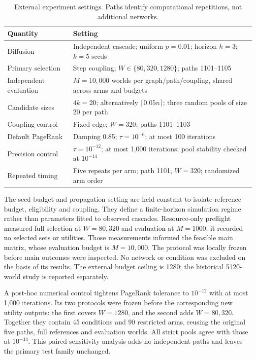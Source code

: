 \documentclass[smallextended]{svjour3}
\begin{document}
\begin{table}[htbp]
\caption{External experiment settings. Paths identify computational repetitions, not additional networks.}\label{tab:settings}
\begin{tabularx}{\linewidth}{lX}
\toprule
Quantity & Setting \\
\midrule
Diffusion & Independent cascade; uniform $p=0.01$; horizon $h=3$; $k=5$ seeds \\
Primary selection & Step coupling; $W\in\{80,320,1280\}$; paths 1101--1105 \\
Independent evaluation & $M=10,000$ worlds per graph/path/coupling, shared across arms and budgets \\
Candidate sizes & $4k=20$; alternatively $\lceil0.05n\rceil$; three random pools of size 20 per path \\
Coupling control & Fixed edge; $W=320$; paths 1101--1103 \\
Default PageRank & Damping 0.85; $\tau=10^{-6}$; at most 100 iterations \\
Precision control & $\tau=10^{-12}$; at most 1,000 iterations; pool stability checked at $10^{-14}$ \\
Repeated timing & Five repeats per arm; path 1101, $W=320$; randomized arm order \\
\bottomrule
\end{tabularx}
\end{table}

The seed budget and propagation setting are held constant to isolate reference budget, eligibility and coupling. They define a finite-horizon simulation regime rather than parameters fitted to observed cascades. Resource-only preflight measured full selection at $W=80,320$ and evaluation at $M=1000$; it recorded no selected sets or utilities. Those measurements informed the feasible main matrix, whose evaluation budget is $M=10,000$. The protocol was locally frozen before main outcomes were inspected. No network or condition was excluded on the basis of its results. The external budget ceiling is 1280; the historical 5120-world study is reported separately.

A post-hoc numerical control tightens PageRank tolerance to $10^{-12}$ with at most 1,000 iterations. Its two protocols were frozen before the corresponding new utility outputs: the first covers $W=1280$, and the second adds $W=80,320$. Together they contain 45 conditions and 90 restricted arms, reusing the original five paths, full references and evaluation worlds. All strict pools agree with those at $10^{-14}$. This paired sensitivity analysis adds no independent paths and leaves the primary test family unchanged.
\end{document}
